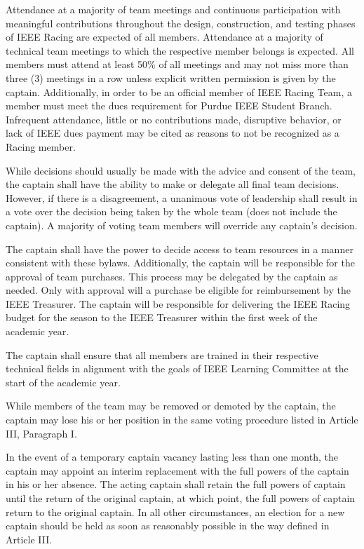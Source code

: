 \documentclass[12pt]{constitution}
\begin{document}
Attendance at a majority of team meetings and continuous participation with meaningful contributions throughout the design, construction, and testing phases of IEEE Racing are expected of all members. Attendance at a majority of technical team meetings to which the respective member belongs is expected. All members must attend at least 50\% of all meetings and may not miss more than three (3) meetings in a row unless explicit written permission is given by the captain. Additionally, in order to be an official member of IEEE Racing Team, a member must meet the dues requirement for Purdue IEEE Student Branch. Infrequent attendance, little or no contributions made, disruptive behavior, or lack of IEEE dues payment may be cited as reasons to not be recognized as a Racing member.

\label{art:decide}

While decisions should usually be made with the advice and consent of the team, the captain shall have the ability to make or delegate all final team decisions. However, if there is a disagreement, a unanimous vote of leadership shall result in a vote over the decision being taken by the whole team (does not include the captain). A majority of voting team members will override any captain's decision.

The captain shall have the power to decide access to team resources in a manner consistent with these bylaws. Additionally, the captain will be responsible for the approval of team purchases. This process may be delegated by the captain as needed. Only with approval will a purchase be eligible for reimbursement by the IEEE Treasurer. The captain will be responsible for delivering the IEEE Racing budget for the season to the IEEE Treasurer within the first week of the academic year.

The captain shall ensure that all members are trained in their respective technical fields in alignment with
the goals of IEEE Learning Committee at the start of the academic year.

While members of the team may be removed or demoted by the captain, the captain may lose his or her position in the same voting procedure listed in Article III, Paragraph I.

In the event of a temporary captain vacancy lasting less than one month, the captain may appoint an interim replacement with the full powers of the captain in his or her absence. The acting captain shall retain the full powers of captain until the return of the original captain, at which point, the full powers of captain return to the original captain. In all other circumstances, an election for a new captain should be held as soon as reasonably possible in the way defined in Article III.
\end{document}
